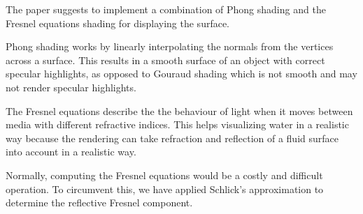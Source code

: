 The paper suggests to implement a combination of Phong shading and the Fresnel equations shading for displaying the surface. 

Phong shading works by linearly interpolating the normals from the vertices across a surface\cite{phong1975illumination}. 
This results in a smooth surface of an object with correct specular highlights, as opposed to Gouraud shading which is not smooth and may not render specular highlights.

The Fresnel equations describe the the behaviour of light when it moves between media with different refractive indices. 
This helps visualizing water in a realistic way because the rendering can take refraction and reflection of a fluid surface into account in a realistic way.

Normally, computing the Fresnel equations would be a costly and difficult operation. To circumvent this, we have applied Schlick's approximation to determine the reflective Fresnel component.
